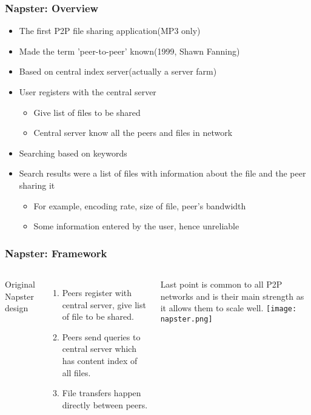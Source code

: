 \begin{frame}
    \frametitle{Napster: Overview}
    \begin{itemize}
        \item The first P2P file sharing application(MP3 only)
        \item Made the term 'peer-to-peer' known(1999, Shawn Fanning)
        \item Based on central index server(actually a server farm)
        \item User registers with the central server
        \begin{itemize}
            \item Give list of files to be shared
            \item Central server know all the peers and files in network
        \end{itemize}
        \item Searching based on keywords
        \item Search results were a list of files with information about the file and the peer sharing it
        \begin{itemize}
            \item For example, encoding rate, size of file, peer's bandwidth
            \item Some information entered by the user, hence unreliable
        \end{itemize}
    \end{itemize}
\end{frame}

\begin{frame}
    \frametitle{Napster: Framework}
    \begin{columns}
        Original Napster design
        \begin{enumerate}
            \item Peers register with central server, give list of file to be shared.
            \item Peers send queries to central server which has content index of all files.
            \item File transfers happen directly between peers.
        \end{enumerate}
        Last point is common to all P2P networks and is their main strength as it allows them to scale well.
            \texttt{[image: napster.png]}
        \end{columns}
\end{frame}


